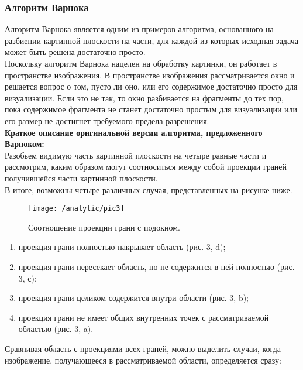 \subsubsection{Алгоритм Варнока}\label{subsec:analytic1.1.2}

Алгоритм Варнока является одним из примеров алгоритма, основанного на разбиении картинной плоскости на части, для каждой из которых исходная задача может быть решена достаточно просто.\\

Поскольку алгоритм Варнока нацелен на обработку картинки, он работает в пространстве изображения. В пространстве изображения рассматривается окно и решается вопрос о том, пусто ли оно, или его содержимое достаточно просто для визуализации. Если это не так, то окно разбивается на фрагменты до тех пор, пока содержимое фрагмента не станет достаточно простым для визуализации или его размер не достигнет требуемого предела разрешения.\\

\textbf{Краткое описание оригинальной версии алгоритма, предложенного Варноком:}\\

Разобьем видимую часть картинной плоскости на четыре равные части и рассмотрим, каким образом могут соотноситься между собой проекции граней получившейся части картинной плоскости.\\

В итоге, возможны четыре различных случая, представленных на рисунке ниже.

\begin{figure}[H]
\center
\texttt{[image: /analytic/pic3]}
\caption{Соотношение проекции грани с подокном.}
\end{figure}

\begin{enumerate}
	\item проекция грани полностью накрывает область (рис. 3, d);
	\item проекция грани пересекает область, но не содержится в ней полностью (рис. 3, с);
	\item проекция грани целиком содержится внутри области (рис. 3, b);
	\item проекция грани не имеет общих внутренних точек с рассматриваемой областью (рис. 3, a).
\end{enumerate}

Сравнивая область с проекциями всех граней, можно выделить случаи, когда изображение, получающееся в рассматриваемой области, определяется сразу:

